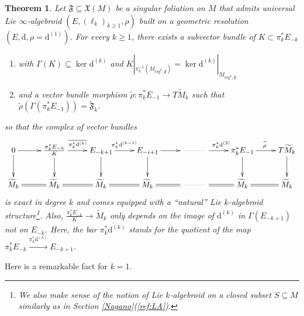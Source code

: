 \documentclass[10pt]{article}
\theoremstyle{plain}
\newtheorem{theorem}[lemma]{Theorem}
\theoremstyle{definition}
\theoremstyle{remark}
\newcommand{\dd}{\mathrm{d}}
\begin{document}
\begin{theorem}\label{thm:projective1} Let $\mathfrak F\subseteq \mathfrak X(M)$ be a singular foliation on $M$ that admits universal Lie $\infty$-algebroid $\left(E,(\ell_k)_{k\geq 1},\rho\right)$ built on a geometric resolution $(E,\dd, \rho=\dd^{(1)})$.  For every $k\geq 1$, there exists a subvector bundle of $K\subset \pi_k^*E_{-k}$

\begin{enumerate}%
    \item  with $\Gamma(K)\subseteq \ker \dd ^{(k)}$ and $K|_{\pi_k^{-1}(M_{\mathrm{reg}^k,\mathfrak F})}= \ker \dd ^{(k)}|_{M_{\mathrm{reg}^k,\mathfrak F}}$
    \item and a vector bundle morphism $\widetilde{\rho}\colon \pi_k^*E_{-1}\to T\widetilde M_k$ such that $\widetilde{\rho}(\Gamma(\pi_k^*E_{-1}))=\widetilde{\mathfrak F}_k$. 
\end{enumerate}
so that the complex of vector bundles $$  \xymatrix{0\ar[r]\ar[d] & \frac{\pi_k^*E_{-k}}{K} \ar[r]^{\overline{\pi_k^*\dd^{(k)}}} \ar[d] & 
     E_{ -k+1} \ar[r]^{{\pi_k^*\dd^{(k-1)}}}
     \ar[d] & E_{-i+1} \ar[r] \ar[d] & \ar@{..}[r] & \ar[r]^>>>>{{\pi_k^*\dd^{(2)}}}& \pi_k^*E_{-1} \ar[r]^{\widetilde\rho} \ar[d]& T\widetilde M_k \ar[d] \\ 
     \widetilde M_k \ar@{=}[r] & \ar@{=}[r] \widetilde M_k  &  \ar@{=}[r] \widetilde M_k 
      &  \ar@{=}[r] \widetilde M_k  &\ar@{..}[r] & \ar@{=}[r]   &  \ar@{=}[r] \widetilde M_k  & \widetilde M_k}
    $$ is exact in degree $k$ and  comes equipped with a “natural”  Lie $k$-algebroid structure\footnote{We also make sense of the notion of Lie $k$-algebroid on a closed subset $S\subseteq M$  similarly as in Section \ref{Nagano}(\ref{ref:LA}).}. Also, $\frac{\pi_k^*E_{-k}}{K}\to\widetilde M_k$ only depends on the image of $\dd^{(k)}$ in $\Gamma(E_{-k+1})$ not on $E_{-k}$.  Here, the bar  $\overline{\pi_k^*\dd^{(k)}}$ stands for the quotient of the map   ${\pi_k^*E_{-k}} \stackrel{{\pi_k^*\dd^{(k)}}}{\longrightarrow} 
     E_{ -k+1}$.


    
\end{theorem}
Here is a remarkable fact for $k=1$.
\end{document}
